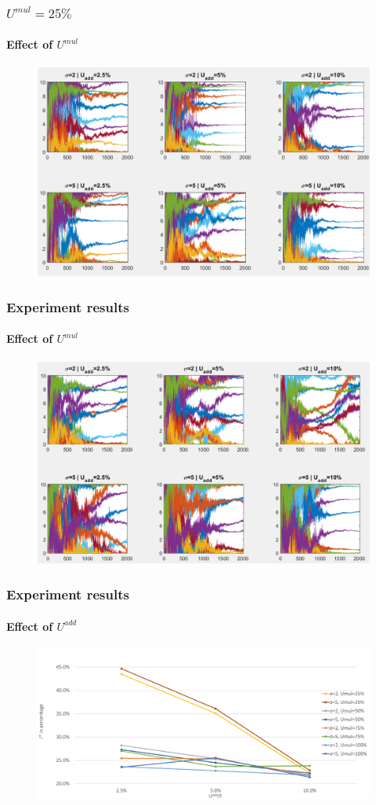 \documentclass[fleqn]{beamer}
\begin{document}
\begin{frame}
	\frametitle{$U^{mul}=25\%$}
	\framesubtitle{Effect of $U^{mul}$}
	\begin{figure}
		\centering
		\includegraphics[width=4.5in]{figures/results_figures/Umul/knobs_Umul_75_lambda_11.png}
	\end{figure}
\end{frame}

\begin{frame}
	\frametitle{Experiment results}
	\framesubtitle{Effect of $U^{mul}$}
	\begin{figure}
		\centering
		\includegraphics[width=4.5in]{figures/results_figures/Umul/knobs_Umul_100_lambda_11.png}
	\end{figure}
\end{frame}


\begin{frame}
	\frametitle{Experiment results}
	\framesubtitle{Effect of $U^{add}$}
	\begin{figure}
		\centering
		\includegraphics[width=4.5in]{figures/Uadd.png}
	\end{figure}
\end{frame}
\end{document}
